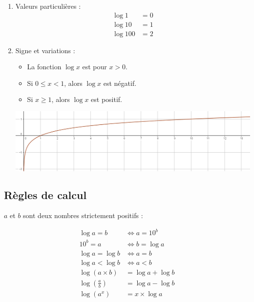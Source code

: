 \documentclass[xcolor={dvipsnames}]{beamer}
\begin{document}
\begin{frame}
	\begin{myprops}
		\begin{enumerate}
			\item Valeurs particulières :
			\begin{align*}
			\log 1 &= 0 \\
			\log 10 &= 1\\
			\log 100 &= 2
			\end{align*}
			
			\item Signe et variations :
			\begin{itemize}
				\item La fonction $\log x$ est  pour $x > 0$.
				\item Si $0 \leq x < 1$, alors $\log x$ est négatif.
				\item Si $x \geq 1$, alors $\log x$ est positif.
			\end{itemize}			
			
			\begin{center}
				\includegraphics[scale = 0.22]{var_log}
			\end{center}	
		\end{enumerate}
		
		
	\end{myprops}
\end{frame}


\subsection{Règles de calcul}
\begin{frame}
	\begin{myprops}
		$a$ et $b$ sont deux nombres strictement positifs :
		
		\begin{align*}
		\log a = b &\Leftrightarrow a = 10^b \\
		10^b = a &\Leftrightarrow b = \log a \\
		\log a = \log b &\Leftrightarrow a = b \\
		\log a < \log b &\Leftrightarrow a < b \\
		\log (a \times b) &= \log a + \log b \\
		\log  \left( \frac{a}{b} \right) &= \log a - \log b \\
		\log(a^x) &= x \times \log a 
		\end{align*}
	\end{myprops}	
\end{frame}
\end{document}
